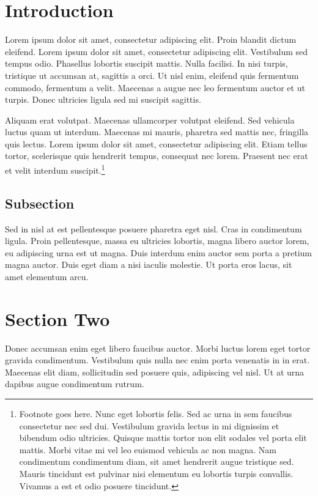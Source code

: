 \documentclass{carver-cyberlaw}
\begin{document}
\section{Introduction}

Lorem ipsum dolor sit amet, consectetur adipiscing elit. Proin blandit dictum 
eleifend. Lorem ipsum dolor sit amet, consectetur adipiscing elit. Vestibulum 
sed tempus odio. Phasellus lobortis suscipit mattis. Nulla facilisi. In nisi 
turpis, tristique ut accumsan at, sagittis a orci. Ut nisl enim, eleifend quis 
fermentum commodo, fermentum a velit. Maecenas a augue nec leo fermentum 
auctor et ut turpis. Donec ultricies ligula sed mi suscipit sagittis.

Aliquam erat volutpat. Maecenas ullamcorper volutpat eleifend. Sed vehicula 
luctus quam ut interdum. Maecenas mi mauris, pharetra sed mattis nec, 
fringilla quis lectus. Lorem ipsum dolor sit amet, consectetur adipiscing 
elit. Etiam tellus tortor, scelerisque quis hendrerit tempus, consequat nec 
lorem. Praesent nec erat et velit interdum suscipit.\footnote{Footnote goes 
here. Nunc eget lobortis felis. Sed ac urna in sem faucibus consectetur nec 
sed dui. Vestibulum gravida lectus in mi dignissim et bibendum odio ultricies. 
Quisque mattis tortor non elit sodales vel porta elit mattis. Morbi vitae mi 
vel leo euismod vehicula ac non magna. Nam condimentum condimentum diam, sit 
amet hendrerit augue tristique sed. Mauris tincidunt est pulvinar nisi 
elementum eu lobortis turpis convallis. Vivamus a est et odio posuere 
tincidunt.}

\subsection{Subsection}

Sed in nisl at est pellentesque posuere pharetra eget nisl. Cras in 
condimentum ligula. Proin pellentesque, massa eu ultricies lobortis, magna 
libero auctor lorem, eu adipiscing urna est ut magna. Duis interdum enim 
auctor sem porta a pretium magna auctor. Duis eget diam a nisi iaculis 
molestie. Ut porta eros lacus, sit amet elementum arcu.

\section{Section Two}

Donec accumsan enim eget libero faucibus auctor. Morbi luctus lorem eget 
tortor gravida condimentum. Vestibulum quis nulla nec enim porta venenatis in 
in erat. Maecenas elit diam, sollicitudin sed posuere quis, adipiscing vel 
nisl. Ut at urna dapibus augue condimentum rutrum.
\end{document}
